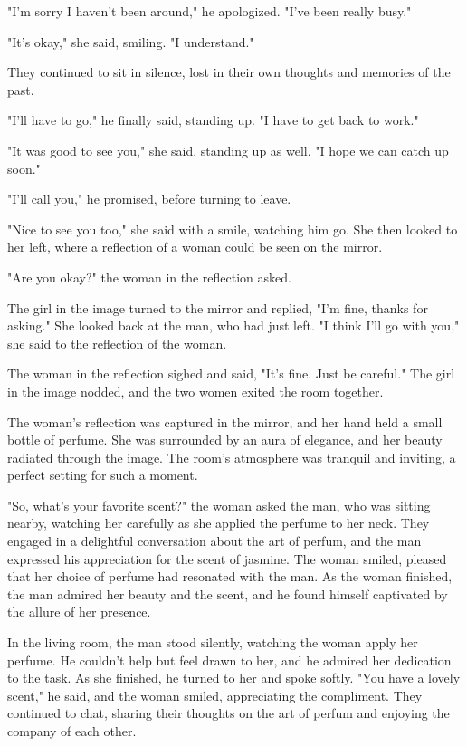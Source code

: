 \documentclass[smalldemyvopaper,11pt,twoside,onecolumn,openright,extrafontsizes]{memoir}
\begin{document}
"I'm sorry I haven't been around," he apologized. "I've been really busy."\par
"It's okay," she said, smiling. "I understand."\par
They continued to sit in silence, lost in their own thoughts and memories of the past.\par
"I'll have to go," he finally said, standing up. "I have to get back to work."\par
"It was good to see you," she said, standing up as well. "I hope we can catch up soon."\par
"I'll call you," he promised, before turning to leave.\par
"Nice to see you too," she said with a smile, watching him go. She then looked to her left, where a reflection of a woman could be seen on the mirror.\par
"Are you okay?" the woman in the reflection asked.\par
The girl in the image turned to the mirror and replied, "I'm fine, thanks for asking." She looked back at the man, who had just left. "I think I'll go with you," she said to the reflection of the woman.\par
The woman in the reflection sighed and said, "It's fine. Just be careful." The girl in the image nodded, and the two women exited the room together.\par
The woman's reflection was captured in the mirror, and her hand held a small bottle of perfume. She was surrounded by an aura of elegance, and her beauty radiated through the image. The room's atmosphere was tranquil and inviting, a perfect setting for such a moment.\par
"So, what's your favorite scent?" the woman asked the man, who was sitting nearby, watching her carefully as she applied the perfume to her neck. They engaged in a delightful conversation about the art of perfum, and the man expressed his appreciation for the scent of jasmine. The woman smiled, pleased that her choice of perfume had resonated with the man. As the woman finished, the man admired her beauty and the scent, and he found himself captivated by the allure of her presence.\par
In the living room, the man stood silently, watching the woman apply her perfume. He couldn't help but feel drawn to her, and he admired her dedication to the task. As she finished, he turned to her and spoke softly. "You have a lovely scent," he said, and the woman smiled, appreciating the compliment. They continued to chat, sharing their thoughts on the art of perfum and enjoying the company of each other.\par
\end{document}
